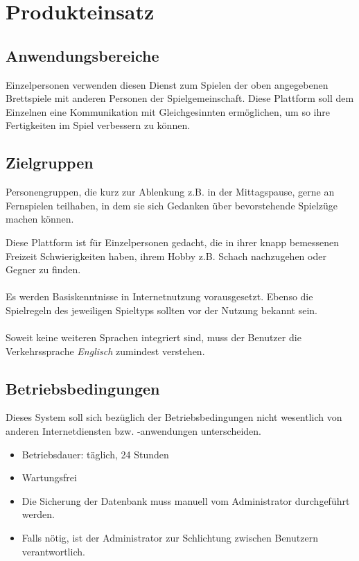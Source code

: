 \section{Produkteinsatz}


\subsection{Anwendungsbereiche}

Einzelpersonen verwenden diesen Dienst zum Spielen der oben angegebenen Brettspiele mit anderen Personen der Spielgemeinschaft.
Diese Plattform soll dem Einzelnen eine Kommunikation mit Gleichgesinnten ermöglichen, um so ihre Fertigkeiten im Spiel verbessern zu können.

\subsection{Zielgruppen}

Personengruppen, die kurz zur Ablenkung z.B. in der Mittagspause, gerne an Fernspielen teilhaben,
in dem sie sich Gedanken über bevorstehende Spielzüge machen können.

Diese Plattform ist für Einzelpersonen gedacht, die in ihrer knapp bemessenen Freizeit Schwierigkeiten haben,
ihrem Hobby z.B. Schach nachzugehen oder Gegner zu finden.\\
\\
Es werden Basiskenntnisse in Internetnutzung vorausgesetzt. Ebenso die Spielregeln des jeweiligen Spieltyps sollten vor der
Nutzung bekannt sein.\\
\\
Soweit keine weiteren Sprachen integriert sind, muss der Benutzer die Verkehrssprache \textit{Englisch} zumindest verstehen.

\subsection{Betriebsbedingungen}

Dieses System soll sich bezüglich der Betriebsbedingungen nicht wesentlich von anderen Internetdiensten bzw. -anwendungen unterscheiden.

\begin{itemize}
	\item Betriebsdauer: täglich, 24 Stunden
	\item Wartungsfrei
	\item Die Sicherung der Datenbank muss manuell vom Administrator durchgeführt werden.
	\item Falls nötig, ist der Administrator zur Schlichtung zwischen Benutzern verantwortlich.
\end{itemize}
